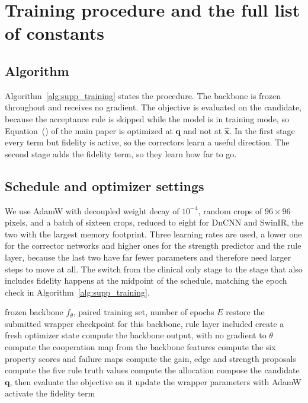 \section{Training procedure and the full list of constants}
\label{sec:supp_training}

\subsection{Algorithm}
Algorithm~\ref{alg:supp_training} states the procedure. The backbone is frozen throughout and
receives no gradient. The objective is evaluated on the candidate, because the acceptance rule is
skipped while the model is in training mode, so Equation~(\EqObjective) of the main paper is
optimized at $\mathbf{q}$ and not at $\hat{\mathbf{x}}$. In the first stage every term but fidelity is active, so the correctors learn a
useful direction. The second stage adds the fidelity term, so they learn how far to go.

\subsection{Schedule and optimizer settings}
We use AdamW with decoupled weight decay of $10^{-4}$, random crops of $96 \times 96$ pixels, and a
batch of sixteen crops, reduced to eight for DnCNN and SwinIR, the two with the largest memory footprint.
Three learning rates are used, a lower one for the corrector networks and higher ones for the
strength predictor and the rule layer, because the last two have far fewer parameters and therefore
need larger steps to move at all. The switch from the clinical only stage to the stage that also
includes fidelity happens at the midpoint of the schedule, matching the epoch check in
Algorithm~\ref{alg:supp_training}.

\begin{algorithm}[t]
\caption{Training the wrapper.}
\label{alg:supp_training}
\begin{algorithmic}[1]
\Require frozen backbone $f_\theta$, paired training set, number of epochs $E$
\State restore the submitted wrapper checkpoint for this backbone, rule layer included
    \State create a fresh optimizer state
    \State compute the backbone output, with no gradient to $\theta$
    \State compute the cooperation map from the backbone features
    \State compute the six property scores and failure maps
    \State compute the gain, edge and strength proposals
    \State compute the five rule truth values
    \State compute the allocation
    \State compose the candidate $\mathbf{q}$, then evaluate the objective on it
    \State {}
    \State update the wrapper parameters with AdamW
  \EndFor
   activate the fidelity term \EndIf
\EndFor
\end{algorithmic}
\end{algorithm}

